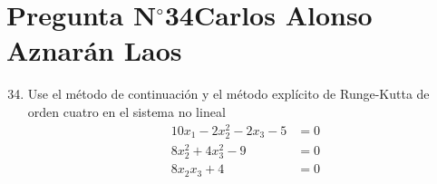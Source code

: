 \section{Pregunta N$^{\circ}$34\qquad Carlos Alonso Aznarán Laos}






\begin{frame}
	\begin{enumerate}\setcounter{enumi}{33}
		\item

		      Use el método de continuación y el método explícito de
		      Runge-Kutta de orden cuatro en el sistema no lineal
		      \begin{align*}
			      10x_{1}-2x^{2}_{2}-2x_{3}-5 & =0 \\
			      8x^2_{2}+4x^2_{3}-9         & =0 \\
			      8x_{2}x_{3}+4               & =0
		      \end{align*}
	\end{enumerate}


\end{frame}
